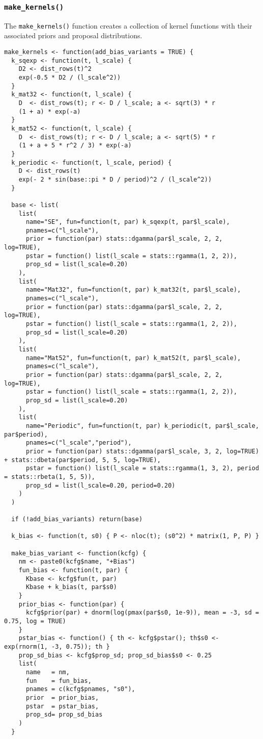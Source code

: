 \documentclass[11pt]{article}
\begin{document}
\subsubsection{\texttt{make\_kernels()}}

The \texttt{make\_kernels()} function creates a collection of kernel functions with their associated priors and proposal distributions.

\begin{lstlisting}
make_kernels <- function(add_bias_variants = TRUE) {
  k_sqexp <- function(t, l_scale) {
    D2 <- dist_rows(t)^2
    exp(-0.5 * D2 / (l_scale^2))
  }
  k_mat32 <- function(t, l_scale) {
    D  <- dist_rows(t); r <- D / l_scale; a <- sqrt(3) * r
    (1 + a) * exp(-a)
  }
  k_mat52 <- function(t, l_scale) {
    D  <- dist_rows(t); r <- D / l_scale; a <- sqrt(5) * r
    (1 + a + 5 * r^2 / 3) * exp(-a)
  }
  k_periodic <- function(t, l_scale, period) {
    D <- dist_rows(t)
    exp(- 2 * sin(base::pi * D / period)^2 / (l_scale^2))
  }

  base <- list(
    list(
      name="SE", fun=function(t, par) k_sqexp(t, par$l_scale),
      pnames=c("l_scale"),
      prior = function(par) stats::dgamma(par$l_scale, 2, 2, log=TRUE),
      pstar = function() list(l_scale = stats::rgamma(1, 2, 2)),
      prop_sd = list(l_scale=0.20)
    ),
    list(
      name="Mat32", fun=function(t, par) k_mat32(t, par$l_scale),
      pnames=c("l_scale"),
      prior = function(par) stats::dgamma(par$l_scale, 2, 2, log=TRUE),
      pstar = function() list(l_scale = stats::rgamma(1, 2, 2)),
      prop_sd = list(l_scale=0.20)
    ),
    list(
      name="Mat52", fun=function(t, par) k_mat52(t, par$l_scale),
      pnames=c("l_scale"),
      prior = function(par) stats::dgamma(par$l_scale, 2, 2, log=TRUE),
      pstar = function() list(l_scale = stats::rgamma(1, 2, 2)),
      prop_sd = list(l_scale=0.20)
    ),
    list(
      name="Periodic", fun=function(t, par) k_periodic(t, par$l_scale, par$period),
      pnames=c("l_scale","period"),
      prior = function(par) stats::dgamma(par$l_scale, 3, 2, log=TRUE) + stats::dbeta(par$period, 5, 5, log=TRUE),
      pstar = function() list(l_scale = stats::rgamma(1, 3, 2), period = stats::rbeta(1, 5, 5)),
      prop_sd = list(l_scale=0.20, period=0.20)
    )
  )

  if (!add_bias_variants) return(base)

  k_bias <- function(t, s0) { P <- nloc(t); (s0^2) * matrix(1, P, P) }

  make_bias_variant <- function(kcfg) {
    nm <- paste0(kcfg$name, "+Bias")
    fun_bias <- function(t, par) {
      Kbase <- kcfg$fun(t, par)
      Kbase + k_bias(t, par$s0)
    }
    prior_bias <- function(par) {
      kcfg$prior(par) + dnorm(log(pmax(par$s0, 1e-9)), mean = -3, sd = 0.75, log = TRUE)
    }
    pstar_bias <- function() { th <- kcfg$pstar(); th$s0 <- exp(rnorm(1, -3, 0.75)); th }
    prop_sd_bias <- kcfg$prop_sd; prop_sd_bias$s0 <- 0.25
    list(
      name   = nm,
      fun    = fun_bias,
      pnames = c(kcfg$pnames, "s0"),
      prior  = prior_bias,
      pstar  = pstar_bias,
      prop_sd= prop_sd_bias
    )
  }


\end{lstlisting}
\end{document}

